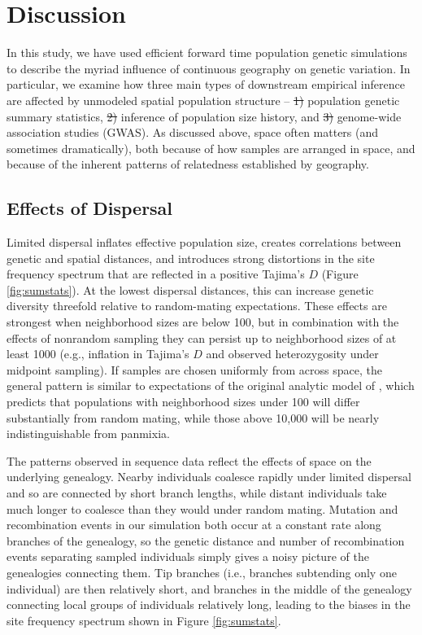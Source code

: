 \documentclass[10pt,twoside,lineno,hidelinks]{preprint} %
\providecommand{\DIFdel}[1]{{\protect\color{red}\sout{#1}}}                      %
\providecommand{\DIFdelbegin}{} %
\providecommand{\DIFdelend}{} %
\begin{document}
\section{Discussion}

In this study,
we have used efficient forward time population genetic simulations 
to describe the myriad influence of continuous geography on genetic variation. 
In particular, we examine how three main types of downstream empirical inference are affected by unmodeled spatial population structure --
\DIFdelbegin \DIFdel{1) }\DIFdelend population genetic summary statistics, \DIFdelbegin \DIFdel{2) }\DIFdelend inference of population size history, and \DIFdelbegin \DIFdel{3) }\DIFdelend genome-wide association studies (GWAS). 
As discussed above, 
space often matters (and sometimes dramatically),
both because of how samples are arranged in space, and because of the inherent patterns of relatedness established by geography.


\subsection{Effects of Dispersal}

Limited dispersal inflates effective population size, creates correlations between genetic and spatial distances, 
and introduces strong distortions in the site frequency spectrum that are reflected in a positive Tajima's $D$ (Figure \ref{fig:sumstats}). 
At the lowest dispersal distances, this can increase genetic diversity threefold relative to random-mating expectations. 
These effects are strongest when neighborhood sizes are below 100, but in combination with the effects of nonrandom sampling they can persist up to neighborhood sizes of at least 1000 (e.g., inflation in Tajima's $D$ and observed heterozygosity under midpoint sampling). 
If samples are chosen uniformly from across space, 
the general pattern is similar to expectations of the original analytic model of \citet{Wright1943}, which predicts that populations with neighborhood sizes under 100 will differ substantially from random mating, 
while those above 10,000 will be nearly indistinguishable from panmixia. 

The patterns observed in sequence data reflect the effects of space on the underlying genealogy. Nearby individuals coalesce rapidly under limited dispersal and so are connected by short branch lengths, while distant individuals take much longer to coalesce than they would under random mating. 
Mutation and recombination events in our simulation both occur at a constant rate along branches of the genealogy, 
so the genetic distance and number of recombination events separating sampled individuals simply gives a noisy picture of the genealogies connecting them. 
Tip branches (i.e., branches subtending only one individual) are then relatively short, and branches in the middle of the genealogy connecting local groups of individuals relatively long, leading to the biases in the site frequency spectrum shown in Figure \ref{fig:sumstats}. 
\end{document}
